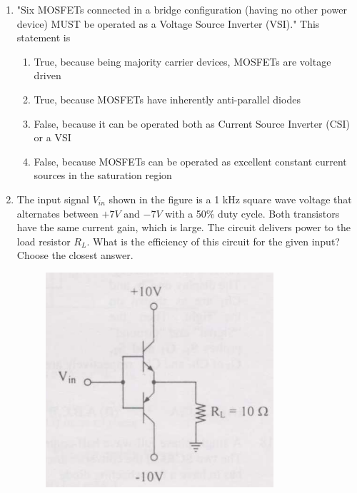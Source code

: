 \documentclass[journal]{IEEEtran}
\numberwithin{equation}{enumi}
\numberwithin{figure}{enumi}
\begin{document}
\begin{enumerate}
\begin{multicols}{4}
\begin{enumerate}
    \item A, C, D
    \item B, C
    \item A, D
    \item B, C, D
\end{enumerate}
\end{multicols}
\item "Six MOSFETs connected in a bridge configuration (having no other power device) MUST be operated as a Voltage Source Inverter (VSI)." This statement is
\begin{enumerate}
    \item True, because being majority carrier devices, MOSFETs are voltage driven
    \item True, because MOSFETs have inherently anti-parallel diodes
    \item False, because it can be operated both as Current Source Inverter (CSI) or a VSI
    \item False, because MOSFETs can be operated as excellent constant current sources in the saturation region
\end{enumerate}
\bigskip
\item The input signal $V_{in}$ shown in the figure is a 1 kHz square wave voltage that alternates between $+7V$ and $-7V$ with a 50\% duty cycle. Both transistors have the same current gain, which is large. The circuit delivers power to the load resistor $R_L$. What is the efficiency of this circuit for the given input? Choose the closest answer.
\begin{figure}[!ht]
    \centering
    \includegraphics[width=\linewidth]{figs/4.png}

\end{figure}
\end{enumerate}
\end{document}
